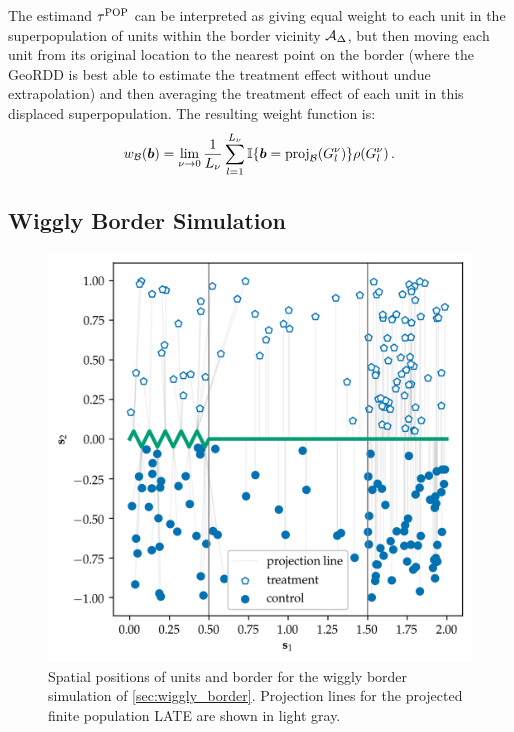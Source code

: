 	The estimand \(\tau^{\mathrm{POP}}\) can be interpreted as giving equal weight to each unit in the superpopulation of units within the border vicinity \(\mathcal{A}_\Delta\), but then moving each unit from its original location to the nearest point on the border (where the GeoRDD is best able to estimate the treatment effect without undue extrapolation) and then averaging the treatment effect of each unit in this displaced superpopulation.
The resulting weight function is:
\begin{equation}
    \weightb(\sentinel) = 
		\lim_{\gridres \rightarrow 0}
		\frac{1}{L_\gridres}
		\sum_{l=1}^{L_\gridres}
			\Ind\cbr{\sentinel = \proj_{\border}\del{\grid_l} } 
			\rho(\grid_l) 
		\,.
\end{equation}

\subsection{Wiggly Border Simulation}
\label{sec:wiggly_border}

\begin{figure}[tb]
\centering
\includegraphics[height=0.35\textheight]{figures/wiggly_boundaries_setup.png}
\caption{
	\label{fig:wiggly_boundaries_setup}
	Spatial positions of units and border for the wiggly border simulation of \autoref{sec:wiggly_border}. Projection lines for the projected finite population LATE are shown in light gray.}
\end{figure}
    


